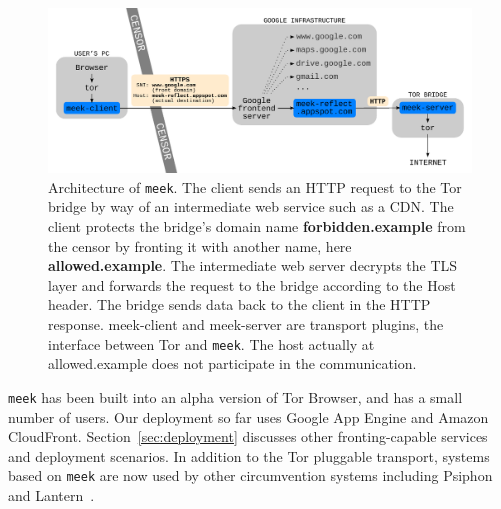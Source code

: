\documentclass[conference]{IEEEtran}
\newcommand{\meekclient}{\mbox{meek-client}\xspace}
\newcommand{\meekserver}{\mbox{meek-server}\xspace}
\newcommand{\meek}{\texttt{meek}\xspace}
\def\urll#1{\begin{NoHyper}\url{#1}\end{NoHyper}}
\begin{document}
\begin{figure}
\centering
\includegraphics[width=\linewidth]{architecture}
\caption{
Architecture of \meek.
The client sends an HTTP request to the Tor bridge by way of an intermediate web service such as a CDN.
The client protects the bridge's domain name \textbf{forbidden.example} from the censor
by fronting it with another name, here \textbf{allowed.example}.
The intermediate web server decrypts the TLS layer and forwards the request to the bridge
according to the Host header.
The bridge sends data back to the client in the HTTP response.
\meekclient and \meekserver are transport plugins, the interface between Tor and \meek.
The host actually at allowed.example does not participate in the communication.
}
\label{fig:architecture}
\end{figure}

\meek has been built into an alpha version of Tor Browser,
and has a small number of users.
Our deployment so far uses Google App Engine and Amazon CloudFront.
Section~\ref{sec:deployment} discusses other fronting-capable services
and deployment scenarios.
In addition to the Tor pluggable transport,
systems based on \meek are now used by other circumvention systems
including Psiphon~\cite{psiphon} and Lantern~\cite{lantern}.

\end{document}
